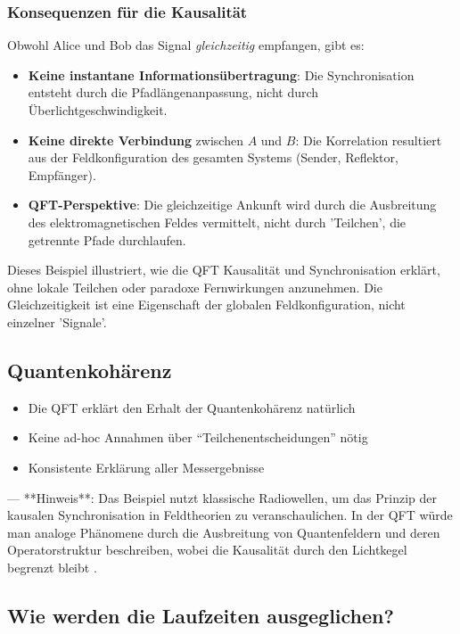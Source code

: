 \documentclass{article}
\begin{document}
	\subsubsection*{Konsequenzen für die Kausalität}  
	Obwohl Alice und Bob das Signal \textit{gleichzeitig} empfangen, gibt es:  
	\begin{itemize}  
		\item \textbf{Keine instantane Informationsübertragung}: Die Synchronisation entsteht durch die Pfadlängenanpassung, nicht durch Überlichtgeschwindigkeit.  
		\item \textbf{Keine direkte Verbindung} zwischen \( A \) und \( B \): Die Korrelation resultiert aus der Feldkonfiguration des gesamten Systems (Sender, Reflektor, Empfänger).  
		\item \textbf{QFT-Perspektive}: Die gleichzeitige Ankunft wird durch die Ausbreitung des elektromagnetischen Feldes vermittelt, nicht durch 'Teilchen', die getrennte Pfade durchlaufen.  
	\end{itemize}  
	
	Dieses Beispiel illustriert, wie die QFT Kausalität und Synchronisation erklärt, ohne lokale Teilchen oder paradoxe Fernwirkungen anzunehmen. Die Gleichzeitigkeit ist eine Eigenschaft der globalen Feldkonfiguration, nicht einzelner 'Signale'.  
	
	\subsection{Quantenkohärenz}  
	\begin{itemize}  
		\item Die QFT erklärt den Erhalt der Quantenkohärenz natürlich  
		\item Keine ad-hoc Annahmen über ``Teilchenentscheidungen'' nötig  
		\item Konsistente Erklärung aller Messergebnisse  
	\end{itemize}  
	
	---  
	**Hinweis**: Das Beispiel nutzt klassische Radiowellen, um das Prinzip der kausalen Synchronisation in Feldtheorien zu veranschaulichen. In der QFT würde man analoge Phänomene durch die Ausbreitung von Quantenfeldern und deren Operatorstruktur beschreiben, wobei die Kausalität durch den Lichtkegel begrenzt bleibt \cite{weinberg}.
	
	
	\subsection{Wie werden die Laufzeiten ausgeglichen?}
	
\end{document}
